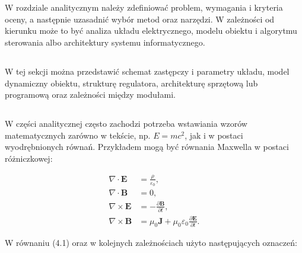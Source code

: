 \chapter{}

W rozdziale analitycznym należy zdefiniować problem, wymagania i kryteria oceny, a następnie uzasadnić wybór metod oraz narzędzi. W zależności od kierunku może to być analiza układu elektrycznego, modelu obiektu i algorytmu sterowania albo architektury systemu informatycznego.

\section{}

W tej sekcji można przedstawić schemat zastępczy i parametry układu, model dynamiczny obiektu, strukturę regulatora, architekturę sprzętową lub programową oraz zależności między modułami.

\section{}

W części analitycznej często zachodzi potrzeba wstawiania wzorów matematycznych zarówno w tekście, np. \(E = mc^2\), jak i w postaci wyodrębnionych równań. Przykładem mogą być równania Maxwella w postaci różniczkowej:

\begin{align}
  \nabla \cdot \mathbf{E} &= \frac{\rho}{\varepsilon_0}, \\
  \nabla \cdot \mathbf{B} &= 0, \\
  \nabla \times \mathbf{E} &= -\frac{\partial \mathbf{B}}{\partial t}, \\
  \nabla \times \mathbf{B} &= \mu_0 \mathbf{J} + \mu_0 \varepsilon_0 \frac{\partial \mathbf{E}}{\partial t}.
\end{align}

W równaniu \mbox{(4.1)} oraz w kolejnych zależnościach użyto następujących oznaczeń:

